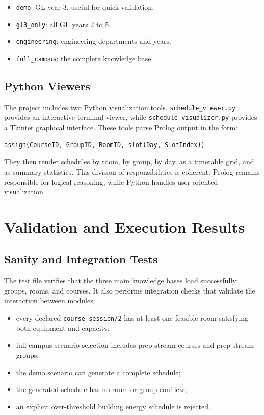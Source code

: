 \documentclass[12pt,a4paper]{article}
\newcommand{\predicate}[1]{\texttt{#1}}
\newcommand{\term}[1]{\texttt{#1}}
\begin{document}
\begin{itemize}
    \item \term{demo}: GL year 3, useful for quick validation.
    \item \term{gl3\_only}: all GL years 2 to 5.
    \item \term{engineering}: engineering departments and years.
    \item \term{full\_campus}: the complete knowledge base.
\end{itemize}

\subsection{Python Viewers}

The project includes two Python visualization tools. \predicate{schedule\_viewer.py} provides an interactive terminal viewer, while \predicate{schedule\_visualizer.py} provides a Tkinter graphical interface. These tools parse Prolog output in the form:

\begin{lstlisting}[caption={Parsed Prolog assignment format}]
assign(CourseID, GroupID, RoomID, slot(Day, SlotIndex))
\end{lstlisting}

They then render schedules by room, by group, by day, as a timetable grid, and as summary statistics. This division of responsibilities is coherent: Prolog remains responsible for logical reasoning, while Python handles user-oriented visualization.

\section{Validation and Execution Results}

\subsection{Sanity and Integration Tests}

The test file verifies that the three main knowledge bases load successfully: groups, rooms, and courses. It also performs integration checks that validate the interaction between modules:

\begin{itemize}
    \item every declared \predicate{course\_session/2} has at least one feasible room satisfying both equipment and capacity;
    \item full-campus scenario selection includes prep-stream courses and prep-stream groups;
    \item the demo scenario can generate a complete schedule;
    \item the generated schedule has no room or group conflicts;
    \item an explicit over-threshold building energy schedule is rejected.
\end{itemize}
\end{document}
